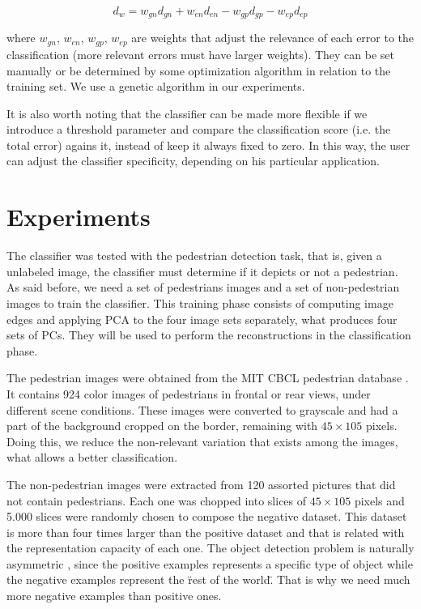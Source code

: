 \documentclass[10pt, conference, compsocconf]{IEEEtran}
\begin{document}
\begin{equation}
  d_w = w_{gn} d_{gn} + w_{en} d_{en} - w_{gp} d_{gp} - w_{ep} d_{ep}
  \label{weighted_total_error}
\end{equation}

\noindent where $w_{gn}$, $w_{en}$, $w_{gp}$, $w_{ep}$ are weights that adjust the relevance of each error to the classification (more relevant errors must have larger weights). They can be set manually or be determined by some optimization algorithm in relation to the training set. We use a genetic algorithm in our experiments.

It is also worth noting that the classifier can be made more flexible if we introduce a threshold parameter and compare the classification score (i.e. the total error) agains it, instead of keep it always fixed to zero. In this way, the user can adjust the classifier specificity, depending on his particular application.


\section{Experiments}

The classifier was tested with the pedestrian detection task, that is, given a unlabeled image, the classifier must determine if it depicts or not a pedestrian. As said before, we need a set of pedestrians images and a set of non-pedestrian images to train the classifier. This training phase consists of computing image edges and applying PCA to the four image sets separately, what produces four sets of PCs. They will be used to perform the reconstructions in the classification phase.

The pedestrian images were obtained from the MIT CBCL pedestrian database \cite{cbcl}. It contains 924 color images of pedestrians in frontal or rear views, under different scene conditions. These images were converted to grayscale and had a part of the background cropped on the border, remaining with $45 \times 105$ pixels. Doing this, we reduce the non-relevant variation that exists among the images, what allows a better classification.

The non-pedestrian images were extracted from 120 assorted pictures that did not contain pedestrians. Each one was chopped into slices of $45 \times 105$ pixels and 5.000 slices were randomly chosen to compose the negative dataset. This dataset is more than four times larger than the positive dataset and that is related with the representation capacity of each one. The object detection problem is naturally asymmetric \cite{jiang09}, since the positive examples represents a specific type of object while the negative examples represent the \"rest of the world\". That is why we need much more negative examples than positive ones.
\end{document}

